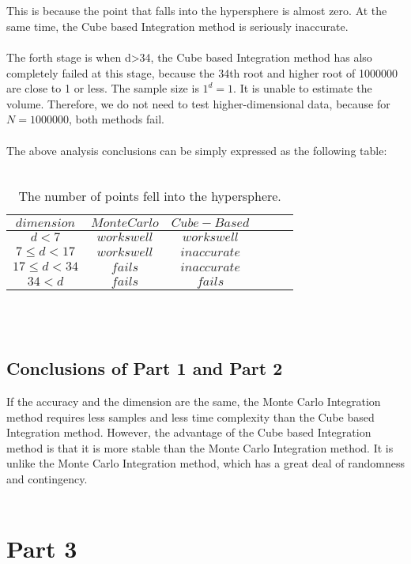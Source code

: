 \documentclass{article}
\begin{document}
		\\
		\\
		This is because the point that falls into the hypersphere is almost zero. At the same time, the Cube based Integration method is seriously inaccurate.
		\\
		\\
		The forth stage is when d>34, the Cube based Integration method has also completely failed at this stage, because the 34th root and higher root of 1000000 are close to 1 or less. The sample size is $1^d = 1$. It is unable to estimate the volume. Therefore, we do not need to test higher-dimensional data, because for $N = 1000000$, both methods fail.
		\\
		\\
		The above analysis conclusions can be simply expressed as the following table:
		\\
		\\
		\begin{table}[htbp]
		\centering
		\begin{tabular}{cccccc}  %
			\hline
			$dimension$ &$Monte Carlo$ &$Cube-Based$\\
			\hline
			$d<7$ &$works well$ &$works well$\\
			$7\leq d < 17$ &$works well$ &$inaccurate$\\
			$17\leq d < 34$ &$fails$ &$inaccurate$\\
			$34 < d$ &$fails$ &$fails$\\
			\hline
		\end{tabular}
		\caption{The number of points fell into the hypersphere.}
		\label{table:table7}
		\end{table}
		\\
		\\
		\subsection*{Conclusions of Part 1 and Part 2}
		If the accuracy and the dimension are the same, the Monte Carlo Integration method requires less samples and less time complexity than the Cube based Integration method. However, the advantage of the Cube based Integration method is that it is more stable than the Monte Carlo Integration method. It is unlike the Monte Carlo Integration method, which has a great deal of randomness and contingency.
		\\
		\\
	\section*{Part 3}
	\label{sec:p3}
\end{document}
